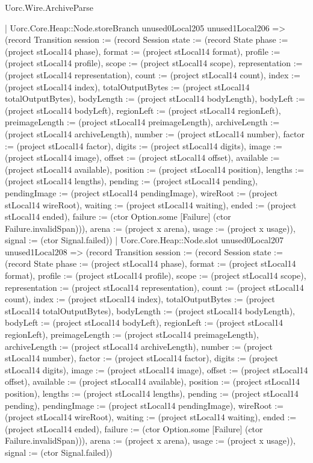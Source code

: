 \begin{lexlean}{Uorc.Wire.ArchiveParse}
\begin{semanticmodule}
{            | Uorc.Core.Heap::Node.storeBranch unused0Local205 unused1Local206 => (record Transition {session := (record Session {state := (record State {phase := (project stLocal14 phase), format := (project stLocal14 format), profile := (project stLocal14 profile), scope := (project stLocal14 scope), representation := (project stLocal14 representation), count := (project stLocal14 count), index := (project stLocal14 index), totalOutputBytes := (project stLocal14 totalOutputBytes), bodyLength := (project stLocal14 bodyLength), bodyLeft := (project stLocal14 bodyLeft), regionLeft := (project stLocal14 regionLeft), preimageLength := (project stLocal14 preimageLength), archiveLength := (project stLocal14 archiveLength), number := (project stLocal14 number), factor := (project stLocal14 factor), digits := (project stLocal14 digits), image := (project stLocal14 image), offset := (project stLocal14 offset), available := (project stLocal14 available), position := (project stLocal14 position), lengths := (project stLocal14 lengths), pending := (project stLocal14 pending), pendingImage := (project stLocal14 pendingImage), wireRoot := (project stLocal14 wireRoot), waiting := (project stLocal14 waiting), ended := (project stLocal14 ended), failure := (ctor Option.some [Failure] (ctor Failure.invalidSpan))}), arena := (project x arena), usage := (project x usage)}), signal := (ctor Signal.failed)})
            | Uorc.Core.Heap::Node.slot unused0Local207 unused1Local208 => (record Transition {session := (record Session {state := (record State {phase := (project stLocal14 phase), format := (project stLocal14 format), profile := (project stLocal14 profile), scope := (project stLocal14 scope), representation := (project stLocal14 representation), count := (project stLocal14 count), index := (project stLocal14 index), totalOutputBytes := (project stLocal14 totalOutputBytes), bodyLength := (project stLocal14 bodyLength), bodyLeft := (project stLocal14 bodyLeft), regionLeft := (project stLocal14 regionLeft), preimageLength := (project stLocal14 preimageLength), archiveLength := (project stLocal14 archiveLength), number := (project stLocal14 number), factor := (project stLocal14 factor), digits := (project stLocal14 digits), image := (project stLocal14 image), offset := (project stLocal14 offset), available := (project stLocal14 available), position := (project stLocal14 position), lengths := (project stLocal14 lengths), pending := (project stLocal14 pending), pendingImage := (project stLocal14 pendingImage), wireRoot := (project stLocal14 wireRoot), waiting := (project stLocal14 waiting), ended := (project stLocal14 ended), failure := (ctor Option.some [Failure] (ctor Failure.invalidSpan))}), arena := (project x arena), usage := (project x usage)}), signal := (ctor Signal.failed)})
}
\end{semanticmodule}
\end{lexlean}
